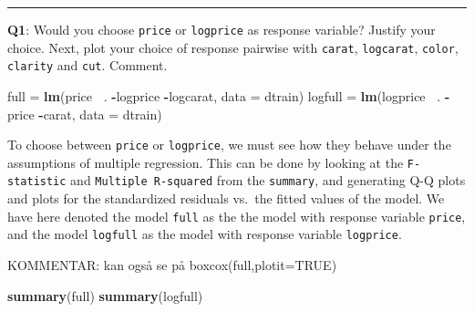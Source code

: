 \documentclass[]{article}
\newenvironment{Shaded}{\begin{snugshade}}{\end{snugshade}}
\newcommand{\KeywordTok}[1]{\textcolor[rgb]{0.13,0.29,0.53}{\textbf{#1}}}
\newcommand{\DataTypeTok}[1]{\textcolor[rgb]{0.13,0.29,0.53}{#1}}
\newcommand{\StringTok}[1]{\textcolor[rgb]{0.31,0.60,0.02}{#1}}
\newcommand{\OperatorTok}[1]{\textcolor[rgb]{0.81,0.36,0.00}{\textbf{#1}}}
\newcommand{\NormalTok}[1]{#1}
\begin{document}
\begin{Shaded}
\end{Shaded}

\begin{center}\rule{0.5\linewidth}{\linethickness}\end{center}

\textbf{Q1}: Would you choose \texttt{price} or \texttt{logprice} as
response variable? Justify your choice. Next, plot your choice of
response pairwise with \texttt{carat}, \texttt{logcarat},
\texttt{color}, \texttt{clarity} and \texttt{cut}. Comment.

\begin{Shaded}
\begin{Highlighting}[]
\NormalTok{full =}\StringTok{ }\KeywordTok{lm}\NormalTok{(price }\OperatorTok{~}\NormalTok{. }\OperatorTok{-}\NormalTok{logprice }\OperatorTok{-}\NormalTok{logcarat, }\DataTypeTok{data =}\NormalTok{ dtrain)}
\NormalTok{logfull =}\StringTok{ }\KeywordTok{lm}\NormalTok{(logprice }\OperatorTok{~}\NormalTok{. }\OperatorTok{-}\NormalTok{price }\OperatorTok{-}\NormalTok{carat, }\DataTypeTok{data =}\NormalTok{ dtrain)}
\end{Highlighting}
\end{Shaded}

To choose between \texttt{price} or \texttt{logprice}, we must see how
they behave under the assumptions of multiple regression. This can be
done by looking at the \texttt{F-statistic} and
\texttt{Multiple\ R-squared} from the \texttt{summary}, and generating
Q-Q plots and plots for the standardized residuals vs.~the fitted values
of the model. We have here denoted the model \texttt{full} as the the
model with response variable \texttt{price}, and the model
\texttt{logfull} as the model with response variable \texttt{logprice}.

KOMMENTAR: kan også se på boxcox(full,plotit=TRUE)

\begin{Shaded}
\begin{Highlighting}[]
\KeywordTok{summary}\NormalTok{(full)}
\KeywordTok{summary}\NormalTok{(logfull)}
\end{Highlighting}
\end{Shaded}
\end{document}
